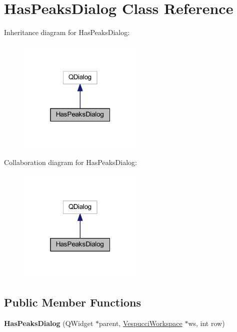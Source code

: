 \hypertarget{class_has_peaks_dialog}{\section{Has\+Peaks\+Dialog Class Reference}
\label{class_has_peaks_dialog}
}


Inheritance diagram for Has\+Peaks\+Dialog\+:\nopagebreak
\begin{figure}[H]
\begin{center}
\leavevmode
\includegraphics[width=169pt]{class_has_peaks_dialog__inherit__graph}
\end{center}
\end{figure}


Collaboration diagram for Has\+Peaks\+Dialog\+:\nopagebreak
\begin{figure}[H]
\begin{center}
\leavevmode
\includegraphics[width=169pt]{class_has_peaks_dialog__coll__graph}
\end{center}
\end{figure}
\subsection*{Public Member Functions}
\begin{DoxyCompactItemize}
\item 
\hypertarget{class_has_peaks_dialog_aa40e1d48d8fc6c16d4985a962da692f6}{{\bfseries Has\+Peaks\+Dialog} (Q\+Widget $\ast$parent, \hyperlink{class_vespucci_workspace}{Vespucci\+Workspace} $\ast$ws, int row)}\label{class_has_peaks_dialog_aa40e1d48d8fc6c16d4985a962da692f6}

\end{DoxyCompactItemize}


